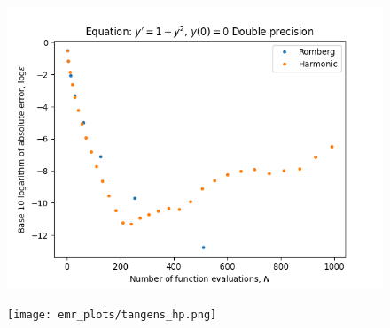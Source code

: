 \begin{figure}[H]
\centering
\begin{minipage}{0.45\textwidth}
\centering
\includegraphics[scale=0.45]{emr_plots/tangens.png}
\end{minipage}
\begin{minipage}{0.45\textwidth}
\centering
\texttt{[image: emr\_plots/tangens\_hp.png]}
\end{minipage}
\end{figure}

